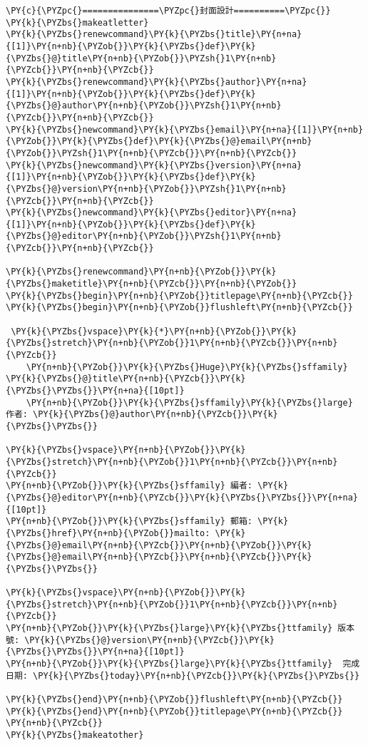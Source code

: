 \begin{Verbatim}[commandchars=\\\{\}]
\PY{c}{\PYZpc{}===============\PYZpc{}封面設計==========\PYZpc{}}
\PY{k}{\PYZbs{}makeatletter}
\PY{k}{\PYZbs{}renewcommand}\PY{k}{\PYZbs{}title}\PY{n+na}{[1]}\PY{n+nb}{\PYZob{}}\PY{k}{\PYZbs{}def}\PY{k}{\PYZbs{}@}title\PY{n+nb}{\PYZob{}}\PYZsh{}1\PY{n+nb}{\PYZcb{}}\PY{n+nb}{\PYZcb{}}
\PY{k}{\PYZbs{}renewcommand}\PY{k}{\PYZbs{}author}\PY{n+na}{[1]}\PY{n+nb}{\PYZob{}}\PY{k}{\PYZbs{}def}\PY{k}{\PYZbs{}@}author\PY{n+nb}{\PYZob{}}\PYZsh{}1\PY{n+nb}{\PYZcb{}}\PY{n+nb}{\PYZcb{}}
\PY{k}{\PYZbs{}newcommand}\PY{k}{\PYZbs{}email}\PY{n+na}{[1]}\PY{n+nb}{\PYZob{}}\PY{k}{\PYZbs{}def}\PY{k}{\PYZbs{}@}email\PY{n+nb}{\PYZob{}}\PYZsh{}1\PY{n+nb}{\PYZcb{}}\PY{n+nb}{\PYZcb{}}
\PY{k}{\PYZbs{}newcommand}\PY{k}{\PYZbs{}version}\PY{n+na}{[1]}\PY{n+nb}{\PYZob{}}\PY{k}{\PYZbs{}def}\PY{k}{\PYZbs{}@}version\PY{n+nb}{\PYZob{}}\PYZsh{}1\PY{n+nb}{\PYZcb{}}\PY{n+nb}{\PYZcb{}}
\PY{k}{\PYZbs{}newcommand}\PY{k}{\PYZbs{}editor}\PY{n+na}{[1]}\PY{n+nb}{\PYZob{}}\PY{k}{\PYZbs{}def}\PY{k}{\PYZbs{}@}editor\PY{n+nb}{\PYZob{}}\PYZsh{}1\PY{n+nb}{\PYZcb{}}\PY{n+nb}{\PYZcb{}}

\PY{k}{\PYZbs{}renewcommand}\PY{n+nb}{\PYZob{}}\PY{k}{\PYZbs{}maketitle}\PY{n+nb}{\PYZcb{}}\PY{n+nb}{\PYZob{}}
\PY{k}{\PYZbs{}begin}\PY{n+nb}{\PYZob{}}titlepage\PY{n+nb}{\PYZcb{}}
\PY{k}{\PYZbs{}begin}\PY{n+nb}{\PYZob{}}flushleft\PY{n+nb}{\PYZcb{}}

 \PY{k}{\PYZbs{}vspace}\PY{k}{*}\PY{n+nb}{\PYZob{}}\PY{k}{\PYZbs{}stretch}\PY{n+nb}{\PYZob{}}1\PY{n+nb}{\PYZcb{}}\PY{n+nb}{\PYZcb{}}
    \PY{n+nb}{\PYZob{}}\PY{k}{\PYZbs{}Huge}\PY{k}{\PYZbs{}sffamily} \PY{k}{\PYZbs{}@}title\PY{n+nb}{\PYZcb{}}\PY{k}{\PYZbs{}\PYZbs{}}\PY{n+na}{[10pt]}
    \PY{n+nb}{\PYZob{}}\PY{k}{\PYZbs{}sffamily}\PY{k}{\PYZbs{}large} 作者: \PY{k}{\PYZbs{}@}author\PY{n+nb}{\PYZcb{}}\PY{k}{\PYZbs{}\PYZbs{}}

\PY{k}{\PYZbs{}vspace}\PY{n+nb}{\PYZob{}}\PY{k}{\PYZbs{}stretch}\PY{n+nb}{\PYZob{}}1\PY{n+nb}{\PYZcb{}}\PY{n+nb}{\PYZcb{}}
\PY{n+nb}{\PYZob{}}\PY{k}{\PYZbs{}sffamily} 編者: \PY{k}{\PYZbs{}@}editor\PY{n+nb}{\PYZcb{}}\PY{k}{\PYZbs{}\PYZbs{}}\PY{n+na}{[10pt]}
\PY{n+nb}{\PYZob{}}\PY{k}{\PYZbs{}sffamily} 郵箱: \PY{k}{\PYZbs{}href}\PY{n+nb}{\PYZob{}}mailto: \PY{k}{\PYZbs{}@}email\PY{n+nb}{\PYZcb{}}\PY{n+nb}{\PYZob{}}\PY{k}{\PYZbs{}@}email\PY{n+nb}{\PYZcb{}}\PY{n+nb}{\PYZcb{}}\PY{k}{\PYZbs{}\PYZbs{}}

\PY{k}{\PYZbs{}vspace}\PY{n+nb}{\PYZob{}}\PY{k}{\PYZbs{}stretch}\PY{n+nb}{\PYZob{}}1\PY{n+nb}{\PYZcb{}}\PY{n+nb}{\PYZcb{}}
\PY{n+nb}{\PYZob{}}\PY{k}{\PYZbs{}large}\PY{k}{\PYZbs{}ttfamily} 版本號: \PY{k}{\PYZbs{}@}version\PY{n+nb}{\PYZcb{}}\PY{k}{\PYZbs{}\PYZbs{}}\PY{n+na}{[10pt]}
\PY{n+nb}{\PYZob{}}\PY{k}{\PYZbs{}large}\PY{k}{\PYZbs{}ttfamily}  完成日期: \PY{k}{\PYZbs{}today}\PY{n+nb}{\PYZcb{}}\PY{k}{\PYZbs{}\PYZbs{}}

\PY{k}{\PYZbs{}end}\PY{n+nb}{\PYZob{}}flushleft\PY{n+nb}{\PYZcb{}}
\PY{k}{\PYZbs{}end}\PY{n+nb}{\PYZob{}}titlepage\PY{n+nb}{\PYZcb{}}
\PY{n+nb}{\PYZcb{}}
\PY{k}{\PYZbs{}makeatother}
\end{Verbatim}
